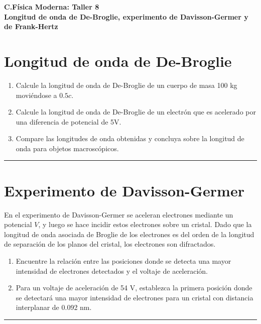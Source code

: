 \documentclass[12pt]{article}
\begin{document}
 
\begin{center}
\Large \textbf{C.Física Moderna: Taller 8}\\
\normalsize \textbf{Longitud de onda de De-Broglie, experimento de Davisson-Germer y de Frank-Hertz}
\end{center}
 
  

\section{Longitud de onda de De-Broglie }



\begin{enumerate}
	\item Calcule la longitud de onda de De-Broglie de un cuerpo de masa 100 kg moviéndose a $0.5c$.
	\item Calcule la longitud de onda de De-Broglie de un electrón que es acelerado por una diferencia de potencial de 5V.
	\item Compare las longitudes de onda obtenidas y concluya sobre la longitud de onda para objetos macroscópicos.
\end{enumerate}

\noindent\rule{16.5cm}{0.4pt}





\section{Experimento de Davisson-Germer}

 En el experimento de Davisson-Germer se aceleran electrones mediante un potencial $V$, y luego
se hace incidir estos electrones sobre un cristal. Dado que la longitud de onda asociada de Broglie de los
electrones es del orden de la longitud de separación de los planos del cristal, los electrones son
difractados.

\begin{enumerate}
	\item Encuentre  la relación entre las posiciones donde se detecta una mayor intensidad de electrones
	detectados y el voltaje de aceleración.
	\item Para un voltaje de aceleración de 54 V, establezca la primera posición donde se detectará una
	mayor intensidad de electrones para un cristal con distancia interplanar de 0.092 nm.
\end{enumerate}

\noindent\rule{16.5cm}{0.4pt}
\end{document}
